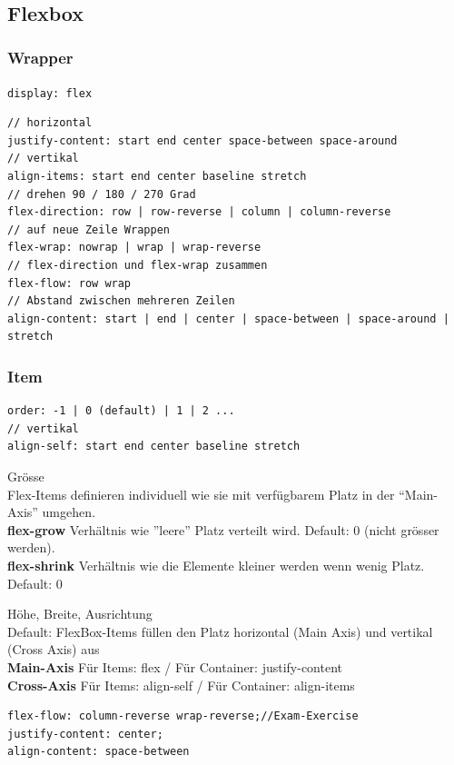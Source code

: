 \vfill
$ $
\columnbreak

\subsection{Flexbox}

\subsubsection{Wrapper}
\texttt{\scriptsize display: flex}
\begin{lstlisting}
// horizontal
justify-content: start end center space-between space-around
// vertikal
align-items: start end center baseline stretch
// drehen 90 / 180 / 270 Grad
flex-direction: row | row-reverse | column | column-reverse
// auf neue Zeile Wrappen
flex-wrap: nowrap | wrap | wrap-reverse
// flex-direction und flex-wrap zusammen
flex-flow: row wrap
// Abstand zwischen mehreren Zeilen
align-content: start | end | center | space-between | space-around | stretch
\end{lstlisting}

\subsubsection{Item}
\begin{lstlisting}
order: -1 | 0 (default) | 1 | 2 ...
// vertikal
align-self: start end center baseline stretch
\end{lstlisting}

\textcolor{subsectioncolor}{Grösse}\\
Flex-Items definieren individuell wie sie mit verfügbarem Platz in der “Main-Axis” umgehen.\\
\textbf{flex-grow} Verhältnis wie ''leere'' Platz verteilt wird. Default: 0 (nicht grösser werden).\\
\textbf{flex-shrink} Verhältnis wie die Elemente kleiner werden wenn wenig Platz. Default: 0

\textcolor{subsectioncolor}{Höhe, Breite, Ausrichtung}\\
Default: FlexBox-Items füllen den Platz horizontal (Main Axis) und vertikal (Cross Axis) aus\\
\textbf{Main-Axis} Für Items: flex / Für Container: justify-content\\
\textbf{Cross-Axis} Für Items: align-self / Für Container: align-items

\begin{lstlisting}
flex-flow: column-reverse wrap-reverse;//Exam-Exercise
justify-content: center;
align-content: space-between
\end{lstlisting}





